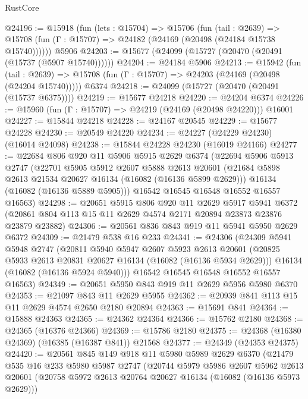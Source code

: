 \begin{lexlean}{RustCore}
\begin{coremodule}
@24196 := @15918
    (fun (lets : @15704) =>
    @15706
      (fun (tail : @2639) =>
      @15708 (fun (Γ : @15707) => @24182 (@24169 (@20498 (@24184 @15738 @15740))))))
    @5906
@24203 := @15677 (@24099 (@15727 (@20470 (@20491 (@15737 (@5907 @15740))))))
@24204 := @24184 @5906
@24213 := @15942
    (fun (tail : @2639) => @15708 (fun (Γ : @15707) => @24203 (@24169 (@20498 (@24204 @15740)))))
    @6374
@24218 := @24099 (@15727 (@20470 (@20491 (@15737 @6375))))
@24219 := @15677 @24218
@24220 := @24204 @6374
@24226 := @15960 (fun (Γ : @15707) => @24219 (@24169 (@20498 @24220))) @16001
@24227 := @15844 @24218
@24228 := @24167 @20545
@24229 := @15677 @24228
@24230 := @20549 @24220
@24234 := @24227 (@24229 @24230) (@16014 @24098)
@24238 := @15844 @24228 @24230 (@16019 @24166)
@24277 := @22684
    @806
    @920
    @11
    @5906
    @5915
    @2629
    @6374
    (@22694
      @5906
      @5913
      @2747
      (@22701
        @5905
        @5912
        @2607
        @5888
        @2613
        @20601
        (@21684 @5898 @2613 @21534 @20627 @16134 (@16082 (@16136 @5899 @2629)))
        @16134
        (@16082 (@16136 @5889 @5905)))
      @16542
      @16545
      @16548
      @16552
      @16557
      @16563)
@24298 := @20651
    @5915
    @806
    @920
    @11
    @2629
    @5917
    @5941
    @6372
    (@20861 @804 @113 @15 @11 @2629 @4574 @2171 @20894 @23873 @23876 @23879 @23882)
@24306 := @20561 @836 @843 @919 @11 @5941 @5950 @2629 @6372
@24309 := @21479 @538 @16 @233
@24341 := @24306
    (@24309
      @5941
      @5948
      @2747
      (@20811
        @5940
        @5947
        @2607
        @5923
        @2613
        @20601
        (@20825 @5933 @2613 @20831 @20627 @16134 (@16082 (@16136 @5934 @2629)))
        @16134
        (@16082 (@16136 @5924 @5940)))
      @16542
      @16545
      @16548
      @16552
      @16557
      @16563)
@24349 := @20651 @5950 @843 @919 @11 @2629 @5956 @5980 @6370
@24353 := @21097 @843 @11 @2629 @5955
@24362 := @20939 @841 @113 @15 @11 @2629 @4574 @2650 @2180 @20894
@24363 := @15691 @841
@24364 := @15888 @24363
@24365 := @24362 @24364
@24366 := @15762 @2180
@24368 := @24365 (@16376 @24366)
@24369 := @15786 @2180
@24375 := @24368 (@16380 @24369) (@16385 (@16387 @841)) @21568
@24377 := @24349 (@24353 @24375)
@24420 := @20561
    @845
    @149
    @918
    @11
    @5980
    @5989
    @2629
    @6370
    (@21479
      @535
      @16
      @233
      @5980
      @5987
      @2747
      (@20744
        @5979
        @5986
        @2607
        @5962
        @2613
        @20601
        (@20758 @5972 @2613 @20764 @20627 @16134 (@16082 (@16136 @5973 @2629)))

\end{coremodule}
\end{lexlean}
